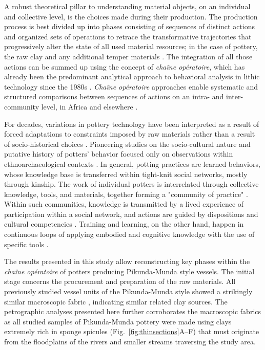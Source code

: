 \documentclass[smallextended,natbib]{svjour3}       %
\begin{document}
A robust theoretical pillar to understanding material objects, on an individual and collective level, is the choices made during their production. The production process is best divided up into phases consisting of sequences of distinct actions and organized sets of operations to retrace the transformative trajectories that progressively alter the state of all used material resources; in the case of pottery, the raw clay and any additional temper materials \citep[3--4]{Gosselain.2018}. The integration of all those actions can be summed up using the concept of \textit{chaîne opératoire}, which has already been the predominant analytical approach to behavioral analysis in lithic technology since the 1980s \citep{Tixier.1980,Tixier.1984,Pelegrin.1988}. \textit{Chaîne opératoire} approaches enable systematic and structured comparisons between sequences of actions on an intra- and inter-community level, in Africa \citep{Gosselain.1992,Gallay.1998,Gosselain.2002,LivingstoneSmith.2007a,Mayor.2011a,MMbogori.2015,Delvoye.2016,Delvoye.2022} and elsewhere \citep[see for example][]{Manem.2008,Ard.2014,Gomart.2014,Gaffney.2020,Heitz.2023}.

For decades, variations in pottery technology have been interpreted as a result of forced adaptations to constraints imposed by raw materials \citep{Braun.1983,Tite.1999,Rice.2015} rather than a result of socio-historical choices \citep{Roux.2017,Gosselain.2018,Roux.2019}. Pioneering studies on the socio-cultural nature and putative history of potters' behavior focused only on observations within ethnoarchaeological contexts \citep{Lechtman.1977}. In general, potting practices are learned behaviors, whose knowledge base is transferred within tight-knit social networks, mostly through kinship. The work of individual potters is interrelated through collective knowledge, tools, and materials, together forming a "community of practice" \citep{Wenger.1998,Lave.1991a,Lave.1991,Roddick.2016}. Within such communities, knowledge is transmitted by a lived experience of participation within a social network, and actions are guided by dispositions and cultural competencies \citep{Heitz.2017a}. Training and learning, on the other hand, happen in continuous loops of applying embodied and cognitive knowledge with the use of specific tools \citep{Kuijpers.2018a}.

The results presented in this study allow reconstructing key phases within the \textit{chaîne opératoire} of potters producing Pikunda-Munda style vessels. The initial stage concerns the procurement and preparation of the raw materials. All previously studied vessel units of the Pikunda-Munda style \citep[114--120]{Seidensticker.2021e} showed a strikingly similar macroscopic fabric \citep[62 Tab.~11,69 Tab.~12]{Seidensticker.2021e}, indicating similar related clay sources. The petrographic analyses presented here further corroborates the macroscopic fabrics as all studied samples of Pikunda-Munda pottery were made using clays extremely rich in sponge spicules (Fig.~\ref{fig:thinsections}A--F) that must originate from the floodplains of the rivers and smaller streams traversing the study area.
\end{document}
